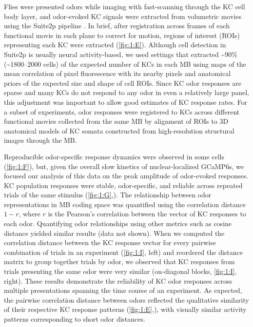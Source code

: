 \documentclass[12pt]{caltech_thesis}
\renewcommand{\cite}{{ }\autocite}
\begin{document}
\begin{refsection}
Flies were presented odors while imaging with fast-scanning through the KC cell body layer, and odor-evoked KC signals were extracted from volumetric movies using the Suite2p pipeline\cite{Suite2p}.
In brief, after registration across frames of each functional movie in each plane to correct for motion, regions of interest (ROIs) representing each KC were extracted (\cref{fig:1:E}).
Although cell detection in Suite2p is usually neural activity-based, we used settings that extracted \textasciitilde90\% (\textasciitilde\numrange{1800}{2000} cells) of the expected number of KCs in each MB using maps of the mean correlation of pixel fluorescence with its nearby pixels and anatomical priors of the expected size and shape of cell ROIs.
Since KC odor responses are sparse and many KCs do not respond to any odor in even a relatively large panel, this adjustment was important to allow good estimates of KC response rates.
For a subset of experiments, odor responses were registered to KCs across different functional movies collected from the same MB by alignment of ROIs to 3D anatomical models of KC somata constructed from high-resolution structural images through the MB.

Reproducible odor-specific response dynamics were observed in some cells (\cref{fig:1:F}), but, given the overall slow kinetics of nuclear-localized GCaMP6s, we focused our analysis of this data on the peak amplitude of odor-evoked responses.
KC population responses were stable, odor-specific, and reliable across repeated trials of the same stimulus (\cref{fig:1:G},).
The relationship between odor representations in MB coding space was quantified using the correlation distance $1-r$, where $r$ is the Pearson's correlation between the vector of KC responses to each odor.
Quantifying odor relationships using other metrics such as cosine distance yielded similar results (data not shown). %
When we computed the correlation distance between the KC response vector for every pairwise combination of trials in an experiment (\cref{fig:1:I}, left) and reordered the distance matrix to group together trials by odor, we observed that KC responses from trials presenting the same odor were very similar (on-diagonal blocks, \cref{fig:1:I}, right).
These results demonstrate the reliability of KC odor responses across multiple presentations spanning the time course of an experiment.
As expected, the pairwise correlation distance between odors reflected the qualitative similarity of their respective KC response patterns (\cref{fig:1:E},), with visually similar activity patterns corresponding to short odor distances.


\end{refsection}
\end{document}
